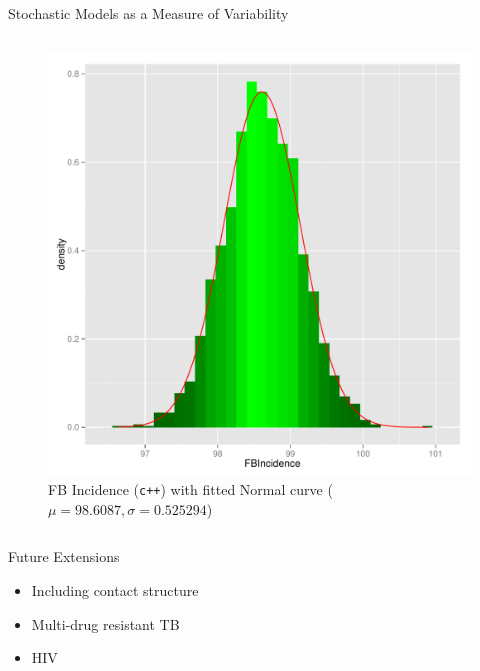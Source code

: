 \documentclass[final]{beamer}
\begin{document}
\begin{frame}
\begin{columns}
\begin{column}{.3\textwidth}
\begin{block}{Stochastic Models as a Measure of Variability}
\begin{block}{}
\begin{column}{.45\textwidth}
\begin{figure}[h]
\begin{center}
                \includegraphics[width=\textwidth]{IN1dist}
              \end{center}
              \caption{FB Incidence (\texttt{c++}) with fitted Normal curve ($\mu = 98.6087, \sigma = 0.525294$)}
              \label{fig:IN1dist}
            \end{figure}
          \end{column}
        \end{block}
      \end{block}
      
      \begin{block}{Future Extensions}
        \begin{itemize}
          \item Including contact structure
          \item Multi-drug resistant TB
          \item HIV
        \end{itemize}
      \end{block}
      
    \end{column}
  \end{columns}
\end{frame}
\end{document}
